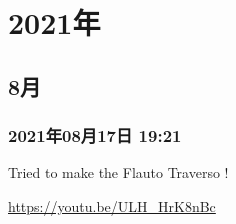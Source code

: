 \documentclass[facebook_diary.tex]{subfiles}
\begin{document}
\chapter{2021年}

\section{8月}

\subsection*{2021年08月17日 19:21}

Tried to make the Flauto Traverso !

\url{https://youtu.be/ULH_HrK8nBc}
\end{document}
